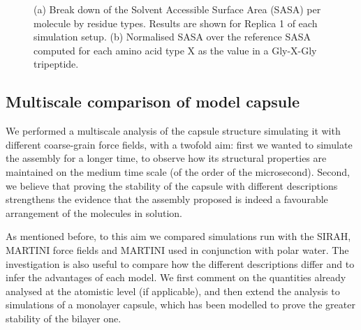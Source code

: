 \begin{figure}[t]
\centering
{} 
\caption[SASA per residue of a buckyball in solution]{(a) Break down of the Solvent Accessible Surface Area (SASA) per molecule by residue types. Results are shown for Replica 1 of each simulation setup. (b) Normalised SASA over the reference SASA computed for each amino acid type X as the value in a Gly-X-Gly tripeptide.}
\label{fig:BTI_sasa_exposed}
\end{figure}


\subsection{Multiscale comparison of model capsule} \label{sec:res_multiscale}

We performed a multiscale analysis of the capsule structure simulating it with different coarse-grain force fields, with a twofold aim: first we wanted to simulate the assembly for a longer time, to observe how its structural properties are maintained on the medium time scale (of the order of the microsecond). Second, we believe that proving the stability of the capsule with different descriptions strengthens the evidence that the assembly proposed is indeed a favourable arrangement of the molecules in solution.

As mentioned before, to this aim we compared simulations run with the SIRAH, MARTINI force fields and MARTINI used in conjunction with polar water. The investigation is also useful to compare how the different descriptions differ and to infer the advantages of each model.
%
We first comment on the quantities already analysed at the atomistic level (if applicable), and then extend the analysis to simulations of a monolayer capsule, which has been modelled to prove the greater stability of the bilayer one.

